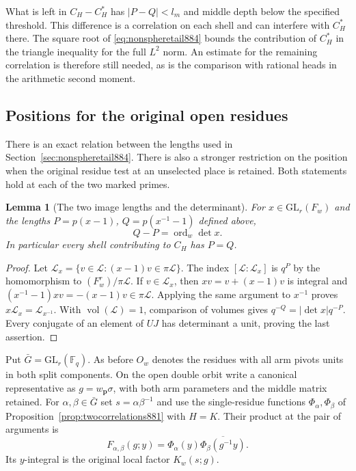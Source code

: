 \documentclass[a4paper,11pt]{article}
\newtheorem{lemma}[proposition]{Lemma}
\theoremstyle{definition}
\theoremstyle{remark}
\numberwithin{equation}{section}
\begin{document}
What is left in \(C_H-C_H^*\) has \(|P-Q|<l_m\) and middle depth
below the specified threshold. This difference is a correlation
on each shell and can interfere with \(C_H^*\) there. The square
root of \eqref{eq:nonspheretail884} bounds the contribution of
\(C_H^*\) in the triangle inequality for the full \(L^2\) norm.
An estimate for the remaining correlation is therefore still
needed, as is the comparison with rational heads in the arithmetic
second moment.
\clearpage

\subsection{Positions for the original open residues}
\label{sec:mixedopen885}

There is an exact relation between the lengths used in
Section~\ref{sec:nonspheretail884}. There is also a stronger
restriction on the position when the original residue test at an
unselected place is retained. Both statements hold at each of the
two marked primes.

\begin{lemma}[The two image lengths and the determinant]
\leavevmode\label{lem:detlength885}
For \(x\in\mathrm{GL}_r(F_w)\) and the lengths \(P=p(x-1)\),
\(Q=p(x^{-1}-1)\) defined above,
\[
                        Q-P=\operatorname{ord}_w\det x .
\]
In particular every shell contributing to \(C_H\) has \(P=Q\).
\end{lemma}
\begin{proof}
Let \(\mathcal L_x=\{v\in\mathcal L:(x-1)v\in\pi\mathcal L\}\).
The index \([\mathcal L:\mathcal L_x]\) is \(q^P\) by the
homomorphism to \((F_w^r)/\pi\mathcal L\). If \(v\in\mathcal L_x\),
then \(xv=v+(x-1)v\) is integral and
\((x^{-1}-1)xv=-(x-1)v\in\pi\mathcal L\). Applying the same argument
to \(x^{-1}\) proves \(x\mathcal L_x=\mathcal L_{x^{-1}}\).
With \(\operatorname{vol}(\mathcal L)=1\), comparison of volumes
gives \(q^{-Q}=|\det x|q^{-P}\). Every conjugate of an element
of \(UJ\) has determinant a unit, proving the last assertion.
\end{proof}

Put \(\bar G=\mathrm{GL}_r(\mathbb F_q)\). As before \(O_w\)
denotes the residues with all arm pivots units in both split
components. On the open double orbit write a canonical representative
as \(g=w_{\mathbf p}\sigma\), with both arm parameters and the middle
matrix retained. For \(\alpha,\beta\in\bar G\) set
\(s=\alpha\beta^{-1}\) and use the single-residue functions
\(\Phi_\alpha,\Phi_\beta\) of Proposition~\ref{prop:twocorrelations881}
with \(H=K\). Their product at the pair of arguments is
\[
   F_{\alpha,\beta}(g;y)
          =\Phi_\alpha(y)\overline{\Phi_\beta(g^{-1}y)} .
\]
Its \(y\)-integral is the original local factor \(K_w(s;g)\).
\end{document}
